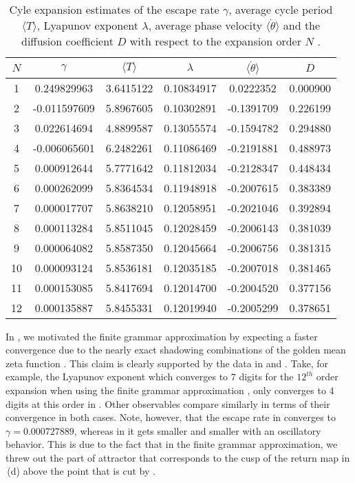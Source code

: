 \documentclass[aip,cha,
reprint,
secnumarabic,
nofootinbib, tightenlines,
nobibnotes, showkeys, showpacs,
superscriptaddress,
]{revtex4-1}
\begin{document}
{\begin{table}
	\begin{tabular}{c|c|c|c|c|c}
	 $N$ & $\gamma$ & $\langle T \rangle$ & $\lambda$ & $\langle \dot{\theta} \rangle$ & $D$ \\ 
	\hline
	1 & 0.249829963 & 3.6415122 & 0.10834917 & 0.0222352 & 0.000900 \\ 
 	2 & -0.011597609 & 5.8967605 & 0.10302891 & -0.1391709 & 0.226199 \\ 
 	3 & 0.022614694 & 4.8899587 & 0.13055574 & -0.1594782 & 0.294880 \\ 
 	4 & -0.006065601 & 6.2482261 & 0.11086469 & -0.2191881 & 0.488973 \\ 
 	5 & 0.000912644 & 5.7771642 & 0.11812034 & -0.2128347 & 0.448434 \\ 
 	6 & 0.000262099 & 5.8364534 & 0.11948918 & -0.2007615 & 0.383389 \\ 
 	7 & 0.000017707 & 5.8638210 & 0.12058951 & -0.2021046 & 0.392894 \\ 
 	8 & 0.000113284 & 5.8511045 & 0.12028459 & -0.2006143 & 0.381039 \\ 
 	9 & 0.000064082 & 5.8587350 & 0.12045664 & -0.2006756 & 0.381315 \\ 
 	10 & 0.000093124 & 5.8536181 & 0.12035185 & -0.2007018 & 0.381465 \\ 
 	11 & 0.000153085 & 5.8417694 & 0.12014700 & -0.2004520 & 0.377156 \\ 
 	12 & 0.000135887 & 5.8455331 & 0.12019940 & -0.2005299 & 0.378651 \\ 
 	\end{tabular}
	\caption{Cyle expansion estimates of the escape rate $\gamma$, average 
    cycle period $\langle T \rangle$, Lyapunov exponent $\lambda$, average 
    phase velocity $\langle \dot{\theta} \rangle$ and the diffusion coefficient 
    $D$ with respect to the expansion order $N$ .}
	\label{t-DynamicalAveragesNoGrammar}
\end{table}

In , we motivated the finite grammar approximation by 
expecting a faster convergence due to the nearly exact shadowing combinations 
of the golden mean zeta function . This 
claim is clearly supported by the data in  and 
. Take, for example, the Lyapunov 
exponent which converges to $7$ digits for the $12^{th}$ order expansion when 
using the finite grammar approximation , only 
converges to $4$ digits at this order in 
. Other observables compare similarly in
terms of their convergence in both cases. Note, however, that the escape rate
in  converges to $\gamma = 0.000727889$, whereas
in  it gets smaller and smaller with an
oscillatory behavior. This is due to the fact that in the finite grammar
approximation, we threw out the part of attractor that corresponds to the
cusp of the return map in \,(d) above the point that
is cut by .

}
\end{document}
